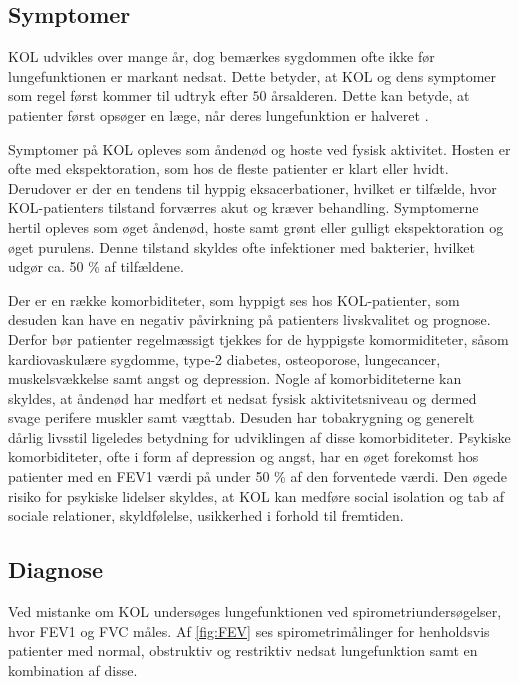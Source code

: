 \subsection{Symptomer}
KOL udvikles over mange år, dog bemærkes sygdommen ofte ikke før lungefunktionen er markant nedsat. Dette betyder, at KOL og dens symptomer som regel først kommer til udtryk efter $50$ årsalderen\cite{Lange2015}. Dette kan betyde, at patienter først opsøger en læge, når deres lungefunktion er halveret \cite{dsam2016}.

Symptomer på KOL opleves som åndenød og hoste ved fysisk aktivitet. Hosten er ofte med ekspektoration, som hos de fleste patienter er klart eller hvidt.\cite{Basisbogen2016} Derudover er der en tendens til hyppig eksacerbationer, hvilket er tilfælde, hvor KOL-patienters tilstand forværres akut og kræver behandling. Symptomerne hertil opleves som øget åndenød, hoste samt grønt eller gulligt ekspektoration og øget purulens. Denne tilstand skyldes ofte infektioner med bakterier, hvilket udgør ca. 50 \% af tilfældene.\cite{dsam2016,Basisbogen2016} 

Der er en række komorbiditeter, som hyppigt ses hos KOL-patienter, som desuden kan have en negativ påvirkning på patienters livskvalitet og prognose. Derfor bør patienter regelmæssigt tjekkes for de hyppigste komormiditeter, såsom kardiovaskulære sygdomme, type-2 diabetes, osteoporose, lungecancer, muskelsvækkelse samt angst og depression.
Nogle af komorbiditeterne kan skyldes, at åndenød har medført et nedsat fysisk aktivitetsniveau og dermed svage perifere muskler samt vægttab. Desuden har tobakrygning og generelt dårlig livsstil ligeledes betydning for udviklingen af disse komorbiditeter. \cite{dsam2016, McCarthy2015}
Psykiske komorbiditeter, ofte i form af depression og angst, har en øget forekomst hos patienter med en FEV1 værdi på under 50 \% af den forventede værdi. Den øgede risiko for psykiske lidelser skyldes, at KOL kan medføre social isolation og tab af sociale relationer, skyldfølelse, usikkerhed i forhold til fremtiden. \cite{dsam2016}


\subsection{Diagnose}
Ved mistanke om KOL undersøges lungefunktionen ved spirometriundersøgelser, hvor FEV1 og FVC måles. Af \autoref{fig:FEV} ses spirometrimålinger for henholdsvis patienter med normal, obstruktiv og restriktiv nedsat lungefunktion samt en kombination af disse.\cite{Basisbogen2016, Sundhed2013}

